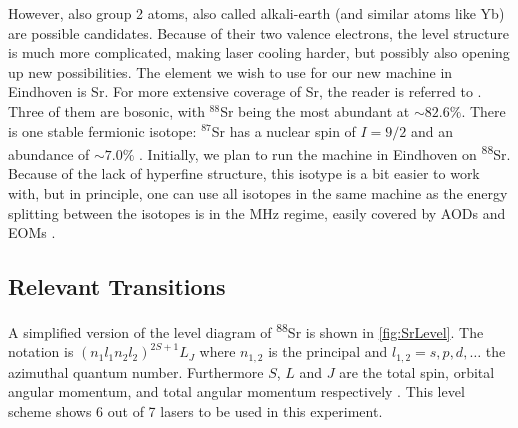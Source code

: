 However, also group 2 atoms, also called alkali-earth (and similar atoms like Yb) are possible candidates. Because of their two valence electrons, the level structure is much more complicated, making laser cooling harder, but possibly also opening up new possibilities. The element we wish to use for our new machine in Eindhoven is Sr. For more extensive coverage of Sr, the reader is referred to \cite{Stellmer2013}. Three of them are bosonic, with ${}^{88}$Sr being the most abundant at $\sim82.6\%$. There is one stable fermionic isotope: ${}^{87}$Sr has a nuclear spin of $I=9/2$ and an abundance of $\sim7.0\%$ \cite{Coursey1999}. Initially, we plan to run the machine in Eindhoven on \textsuperscript{88}Sr. Because of the lack of hyperfine structure, this isotype is a bit easier to work with, but in principle, one can use all isotopes in the same machine as the energy splitting between the isotopes is in the MHz regime, easily covered by AODs and EOMs \cite{Stellmer2013}.

\subsection{Relevant Transitions}

A simplified version of the level diagram of \textsuperscript{88}Sr is shown in \cref{fig:SrLevel}. The notation is $(n_1l_1 n_2l_2)^{2S+1}L_J$ where $n_{1,2}$ is the principal and $l_{1,2} = s, p, d, \ldots$ the azimuthal quantum number. Furthermore $S$, $L$ and $J$ are the total spin, orbital angular momentum, and total angular momentum respectively \cite{Cowan1981}.  This level scheme shows 6 out of 7 lasers to be used in this experiment. 

